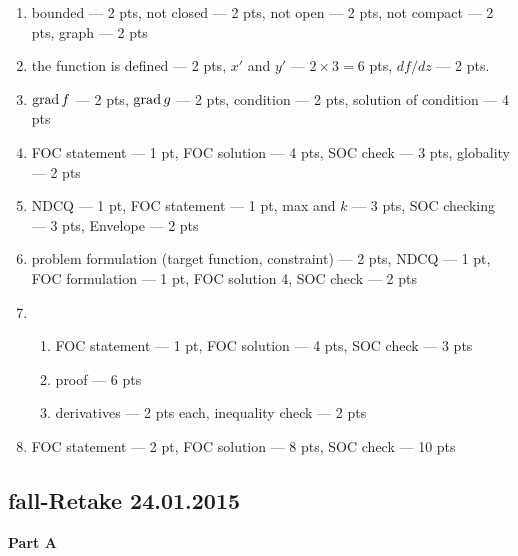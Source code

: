\begin{enumerate}
\item bounded --- 2 pts, not closed --- 2 pts, not open --- 2 pts, not compact --- 2 pts, graph --- 2 pts
\item the function is defined --- 2 pts, $x'$ and $y'$ --- $2\times 3=6$ pts, $df/dz$ --- 2 pts.
\item $\mathrm{grad}\, f$ --- 2 pts, $\mathrm{grad}\, g$ --- 2 pts, condition --- 2 pts, solution of condition --- 4 pts
\item FOC statement --- 1 pt, FOC solution --- 4 pts, SOC check --- 3 pts, globality --- 2 pts
\item NDCQ --- 1 pt, FOC statement --- 1 pt, max and $k$ --- 3 pts, SOC checking --- 3 pts, Envelope  --- 2 pts
\item problem formulation (target function, constraint) --- 2 pts, NDCQ --- 1 pt, FOC formulation --- 1 pt, FOC solution 4, SOC check --- 2 pts
\item
\begin{enumerate}
\item FOC statement --- 1 pt, FOC solution --- 4 pts, SOC check --- 3 pts
\item proof --- 6 pts
\item derivatives --- 2 pts each, inequality check --- 2 pts
\end{enumerate}
\item FOC statement --- 2 pt, FOC solution --- 8 pts, SOC check --- 10 pts
\end{enumerate}


\subsection{fall-Retake 24.01.2015}

\textbf{Part A}


